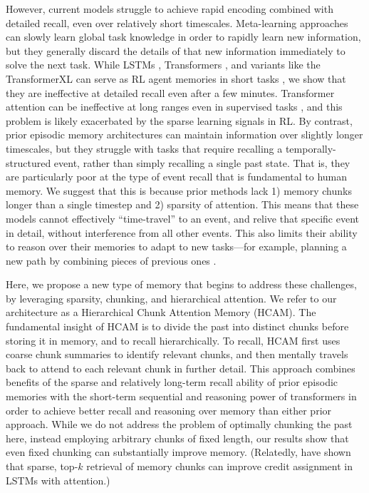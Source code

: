 \documentclass{article}
\begin{document}
However, current models struggle to achieve rapid encoding combined with detailed recall, even over relatively short timescales. Meta-learning approaches \citep{wang2021meta} can slowly learn global task knowledge in order to rapidly learn new information, but they generally discard the details of that new information immediately to solve the next task. While LSTMs \citep{hochreiter1997long}, Transformers \citep{vaswani2017attention}, and variants like the TransformerXL \citep{dai2019transformer} can serve as RL agent memories in short tasks \citep{parisotto2020stabilizing}, we show that they are ineffective at detailed recall even after a few minutes. Transformer attention can be ineffective at long ranges even in supervised tasks \citep{tay2021long}, and this problem is likely exacerbated by the sparse learning signals in RL. By contrast, prior episodic memory architectures \citep{hung2019optimizing,fortunato2019generalization} can maintain information over slightly longer timescales, but they struggle with tasks that require recalling a temporally-structured event, rather than simply recalling a single past state. That is, they are particularly poor at the type of event recall that is fundamental to human memory. We suggest that this is because prior methods lack 1) memory chunks longer than a single timestep and 2) sparsity of attention. This means that these models cannot effectively ``time-travel'' to an event, and relive that specific event in detail, without interference from all other events. This also limits their ability to reason over their memories to adapt to new tasks---for example, planning a new path by combining pieces of previous ones \citep{ritter2020rapid}.

Here, we propose a new type of memory that begins to address these challenges, by leveraging sparsity, chunking, and hierarchical attention. We refer to our architecture as a Hierarchical Chunk Attention Memory (HCAM). The fundamental insight of HCAM is to divide the past into distinct chunks before storing it in memory, and to recall hierarchically. To recall, HCAM first uses coarse chunk summaries to identify relevant chunks, and then mentally travels back to attend to each relevant chunk in further detail. This approach combines benefits of the sparse and relatively long-term recall ability of prior episodic memories \citep[]{wayne2018unsupervised,ritter2020rapid} with the short-term sequential and reasoning power of transformers \citep{vaswani2017attention,dai2019transformer,parisotto2020stabilizing} in order to achieve better recall and reasoning over memory than either prior approach. While we do not address the problem of optimally chunking the past here, instead employing arbitrary chunks of fixed length, our results show that even fixed chunking can substantially improve memory. (Relatedly, \citet{ke2018sparse} have shown that sparse, top-\(k\) retrieval of memory chunks can improve credit assignment in LSTMs with attention.)
\end{document}
